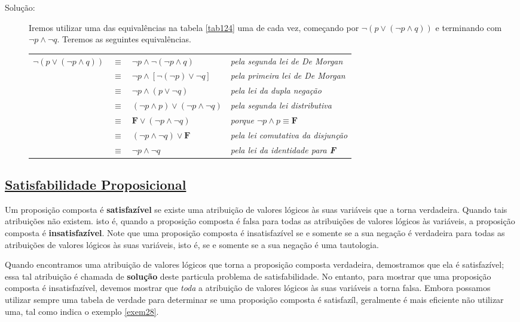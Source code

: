 \begin{description}
\item[Solução:] Iremos utilizar uma das equivalências na tabela \ref{tab124}
uma de cada vez, começando por $\lnot (p \lor (\lnot p \land q))$ e terminando
com $\lnot p \land \lnot q$. Teremos as seguintes equivalências.

\begin{table}[H]
	\centering
	\begin{tabular}{rcll}%
	$\lnot (p \lor (\lnot p \land q))$ & $\equiv$ & $\lnot p \land \lnot (\lnot p
	\land q)$ & \emph{pela segunda lei de De Morgan}\\
	 & $\equiv$ & $\lnot p \land [\lnot(\lnot p) \lor \lnot q]$ & \emph{pela
	 primeira lei de De Morgan}\\	
	& $\equiv$ & $\lnot p \land (p \lor \lnot q)$ & \emph{pela lei da dupla
	negação}\\
	& $\equiv$ & $(\lnot p \land p) \lor (\lnot p \land \lnot q)$ & \emph{pela
	segunda lei distributiva}\\
	& $\equiv$ & $\textbf{F} \lor (\lnot p \land \lnot q)$ & \emph{porque $\lnot
	p \land p \equiv \textbf{F}$}\\
	& $\equiv$ & $(\lnot p \land \lnot q) \lor \textbf{F}$ & \emph{pela lei
	comutativa da disjunção}\\
	& $\equiv$ & $\lnot p \land \lnot q$ & \emph{pela lei da identidade para
	\textbf{F}}
	
	\end{tabular}%
\end{table}
\end{description}

\subsection*{\underline{Satisfabilidade Proposicional}}

Um proposição composta é \textbf{satisfazível} se existe uma atribuição de
valores lógicos às suas variáveis que a torna verdadeira. Quando tais
atribuições não existem. isto é, quando a proposição composta é falsa para todas
as atribuições de valores lógicos às variáveis, a proposição composta é
\textbf{insatisfazível}. Note que uma proposição composta é insatisfazível se e
somente se a sua negação é verdadeira para todas as atribuições de valores
lógicos às suas variáveis, isto é, se e somente se a sua negação é uma
tautologia.

Quando encontramos uma atribuição de valores lógicos que torna a proposição
composta verdadeira, demostramos que ela é satisfazível; essa tal atribuição é
chamada de \textbf{solução} deste particula problema de satisfabilidade. No
entanto, para mostrar que uma proposição composta é insatisfazível, devemos
mostrar que \emph{toda} a atribuição de valores lógicos às suas variáveis a
torna falsa. Embora possamos utilizar sempre uma tabela de verdade para
determinar se uma proposição composta é satisfazíl, geralmente é mais eficiente
não utilizar uma, tal como indica o exemplo \ref{exem28}.


